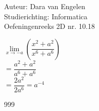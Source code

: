 \documentclass[a4paper]{article}
\begin{document}
  
\noindent \large Auteur: Dara van Engelen\\
\noindent \large Studierichting: Informatica\\
\noindent \large Oefeningenreeks 2D nr. 10.18\\

\medskip

\normalsize


$\lim\limits_{x\rightarrow - a}\left(\dfrac{x^2 + a^2}{x^6 + a^6}\right) $\\

$= \dfrac{a^2+a^2}{a^6+a^6}$\\

$= \dfrac{2a^2}{2a^6} = a^{-4}$



\begin{thebibliography}{999}
\end{thebibliography}
\end{document}
